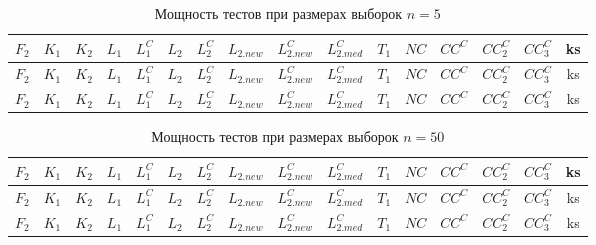 \documentclass{article}
\begin{document}
\begin{longtable}{|c|c|c|c|c|c|c|c|c|c|c|c|c|c|c|c|}
  \caption{Мощность тестов при размерах выборок $n=5$}
  \label{table:n5} \\
  \hline
  $F_2$ & $K_{1}$ & $K_{2}$ & $L_{1}$ & $L_{1}^C$ & $L_{2}$ & $L_{2}^C$ & $L_{2.new}$ & $L_{2.new}^C$ & $L_{2.med}^C$ & $T_1$ & $NC$ & $CC^C$ & $CC_2^C$ & $CC_3^C$ & ks \\ \hline
  
  
  
  
  $F_2$ & $K_{1}$ & $K_{2}$ & $L_{1}$ & $L_{1}^C$ & $L_{2}$ & $L_{2}^C$ & $L_{2.new}$ & $L_{2.new}^C$ & $L_{2.med}^C$ & $T_1$ & $NC$ & $CC^C$ & $CC_2^C$ & $CC_3^C$ & ks \\ \hline
  
  
  
  
  $F_2$ & $K_{1}$ & $K_{2}$ & $L_{1}$ & $L_{1}^C$ & $L_{2}$ & $L_{2}^C$ & $L_{2.new}$ & $L_{2.new}^C$ & $L_{2.med}^C$ & $T_1$ & $NC$ & $CC^C$ & $CC_2^C$ & $CC_3^C$ & ks \\ \hline
  
  
  
  
\end{longtable}

\begin{longtable}{|c|c|c|c|c|c|c|c|c|c|c|c|c|c|c|c|}
  \caption{Мощность тестов при размерах выборок $n=50$}
  \label{table:n50} \\
  \hline
  $F_2$ & $K_{1}$ & $K_{2}$ & $L_{1}$ & $L_{1}^C$ & $L_{2}$ & $L_{2}^C$ & $L_{2.new}$ & $L_{2.new}^C$ & $L_{2.med}^C$ & $T_1$ & $NC$ & $CC^C$ & $CC_2^C$ & $CC_3^C$ & ks \\ \hline
  
  
  
  
  $F_2$ & $K_{1}$ & $K_{2}$ & $L_{1}$ & $L_{1}^C$ & $L_{2}$ & $L_{2}^C$ & $L_{2.new}$ & $L_{2.new}^C$ & $L_{2.med}^C$ & $T_1$ & $NC$ & $CC^C$ & $CC_2^C$ & $CC_3^C$ & ks \\ \hline
  
  
  
  
  $F_2$ & $K_{1}$ & $K_{2}$ & $L_{1}$ & $L_{1}^C$ & $L_{2}$ & $L_{2}^C$ & $L_{2.new}$ & $L_{2.new}^C$ & $L_{2.med}^C$ & $T_1$ & $NC$ & $CC^C$ & $CC_2^C$ & $CC_3^C$ & ks \\ \hline
  
  
  
  
\end{longtable}
\end{document}

